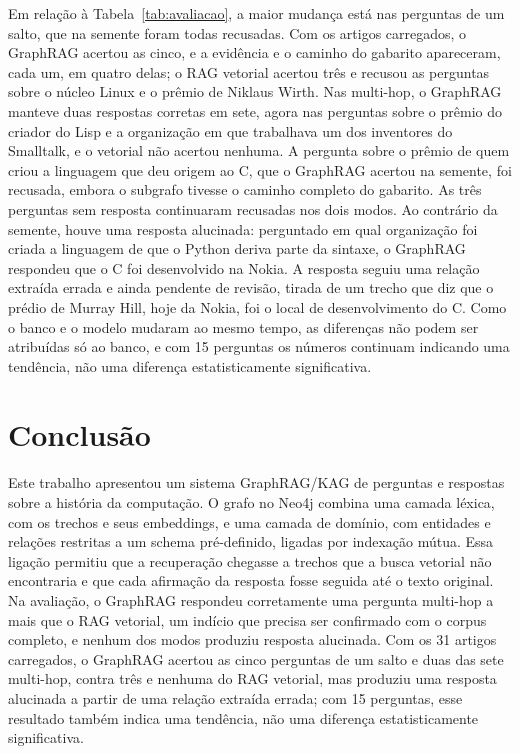 \documentclass[12pt]{article}
\begin{document}
Em relação à Tabela~\ref{tab:avaliacao}, a maior mudança está nas perguntas de um salto,
que na semente foram todas recusadas. Com os artigos carregados, o GraphRAG acertou as
cinco, e a evidência e o caminho do gabarito apareceram, cada um, em quatro delas; o RAG
vetorial acertou três e recusou as perguntas sobre o núcleo Linux e o prêmio de Niklaus
Wirth. Nas multi-hop, o GraphRAG manteve duas respostas corretas em sete, agora nas
perguntas sobre o prêmio do criador do Lisp e a organização em que trabalhava um dos
inventores do Smalltalk, e o vetorial não acertou nenhuma. A pergunta sobre o prêmio de
quem criou a linguagem que deu origem ao C, que o GraphRAG acertou na semente, foi
recusada, embora o subgrafo tivesse o caminho completo do gabarito. As três perguntas
sem resposta continuaram recusadas nos dois modos. Ao contrário da semente, houve uma
resposta alucinada: perguntado em qual organização foi criada a linguagem de que o Python
deriva parte da sintaxe, o GraphRAG respondeu que o C foi desenvolvido na Nokia. A
resposta seguiu uma relação extraída errada e ainda pendente de revisão, tirada de um
trecho que diz que o prédio de Murray Hill, hoje da Nokia, foi o local de desenvolvimento
do C. Como o banco e o modelo mudaram ao mesmo tempo, as diferenças não podem ser
atribuídas só ao banco, e com 15 perguntas os números continuam indicando uma tendência,
não uma diferença estatisticamente significativa.

\section{Conclusão}
\label{sec:conclusao}

Este trabalho apresentou um sistema GraphRAG/KAG de perguntas e respostas sobre a
história da computação. O grafo no Neo4j combina uma camada léxica, com os trechos e seus
embeddings, e uma camada de domínio, com entidades e relações restritas a um schema
pré-definido, ligadas por indexação mútua. Essa ligação permitiu que a recuperação chegasse
a trechos que a busca vetorial não encontraria e que cada afirmação da resposta fosse
seguida até o texto original. Na avaliação, o GraphRAG respondeu corretamente uma pergunta
multi-hop a mais que o RAG vetorial, um indício que precisa ser confirmado com o corpus
completo, e nenhum dos modos produziu resposta alucinada. Com os 31 artigos carregados,
o GraphRAG acertou as cinco perguntas de um salto e duas das sete multi-hop, contra três
e nenhuma do RAG vetorial, mas produziu uma resposta alucinada a partir de uma relação
extraída errada; com 15 perguntas, esse resultado também indica uma tendência, não uma
diferença estatisticamente significativa.
\end{document}
